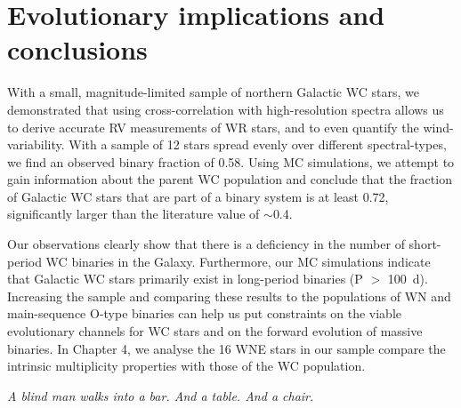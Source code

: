 \section{Evolutionary implications and conclusions}\label{sect:conclusions}
With a small, magnitude-limited sample of northern Galactic WC stars, we demonstrated that using cross-correlation with high-resolution spectra allows us to derive accurate RV measurements of WR stars, and to even quantify the wind-variability. With a sample of 12 stars spread evenly over different spectral-types, we find an observed binary fraction of 0.58. Using MC simulations, we attempt to gain information about the parent WC population and conclude that the fraction of Galactic WC stars that are part of a binary system is at least 0.72, significantly larger than the literature value of ${\sim}$0.4.

Our observations clearly show that there is a deficiency in the number of short-period WC binaries in the Galaxy. Furthermore, our MC simulations indicate that Galactic WC stars primarily exist in long-period binaries (P $>$ 100~d). Increasing the sample and comparing these results to the populations of WN and main-sequence O-type binaries can help us put constraints on the viable evolutionary channels for WC stars and on the forward evolution of massive binaries. In Chapter 4, we analyse the 16 WNE stars in our sample compare the intrinsic multiplicity properties with those of the WC population.

\clearpage
\thispagestyle{empty}
\hspace{0pt}
\vfill
\textit{A blind man walks into a bar. And a table. And a chair.}
\vfill
\clearpage


